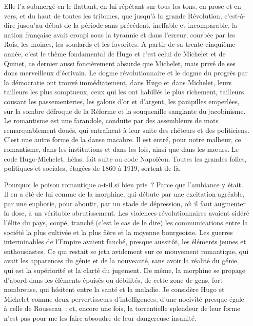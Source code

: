 \documentclass[french,twoside]{book} %
\begin{document}
Elle l’a submergé en le flattant, en lui répétant sur tous les tons, en prose et en vers, et du haut de toutes les tribunes, que jusqu’à la grande Révolution, c’est-à-dire jusqu’au début de la période sans précédent, ineffable et incomparable, la nation française avait croupi sous la tyrannie et dans l’erreur, courbée par les Rois, les moines, les soudards et les favorites. A partir de sa trente-cinquième année, c’est le thème fondamental de Hugo et c’est celui de Michelet et de Quinet, ce dernier aussi foncièrement absurde que Michelet, mais privé de ses dons merveilleux d’écrivain. Le dogme révolutionnaire et le dogme du progrès par la démocratie ont trouvé immédiatement, dans Hugo et dans Michelet, leurs tailleurs les plus somptueux, ceux qui les ont habillés le plus richement, tailleurs cousant les passementeries, les galons d’or et d’argent, les pampilles emperlées, sur la sombre défroque de la Réforme et la souquenille sanglante du jacobinisme. Le romantisme est une farandole, conduite par des assembleurs de mots remarquablement doués, qui entraînent à leur suite des rhéteurs et des politiciens. C’est une autre forme de la danse macabre. Il est entré, pour notre malheur, ce romantisme, dans les institutions et dans les lois, ainsi que dans les mœurs. Le code Hugo-Michelet, hélas, fait suite au code Napoléon. Toutes les grandes folies, politiques et sociales, étagées de 1860 à 1919, sortent de là.\par
Pourquoi le poison romantique a-t-il si bien pris ? Parce que l’ambiance y était. Il en a été de lui comme de la morphine, qui débute par une excitation agréable, par une euphorie, pour aboutir, par un stade de dépression, où il faut augmenter la dose, à un véritable abrutissement. Les violences révolutionnaires avaient sidéré l’élite du pays, coupé, tranché (c’est le cas de le dire) les communications entre la société la plus cultivée et la plus fière et la moyenne bourgeoisie. Les guerres interminables de l’Empire avaient fauché, presque aussitôt, les éléments jeunes et enthousiastes. Ce qui restait se jeta avidement sur ce mouvement romantique, qui avait les apparences du génie et de la nouveauté, sans avoir la réalité du génie, qui est la supériorité et la clarté du jugement. De même, la morphine se propage d’abord dans les éléments épuisés ou débilités, de cette zone de gens, fort nombreuse, qui hésitent entre la santé et la maladie. Je considère Hugo et Michelet comme deux pervertisseurs d’intelligences, d’une nocivité presque égale à celle de Rousseau ; et, encore une fois, la torrentielle splendeur de leur forme n’est pas pour me les faire absoudre de leur dangereuse insanité.\par
\end{document}
